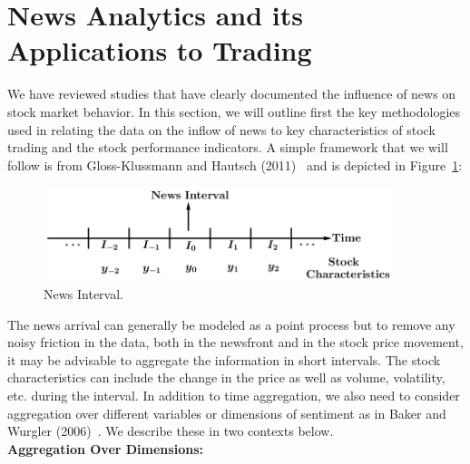 \section{News Analytics and its Applications to Trading}


We have reviewed studies that have clearly documented the influence of news on stock market behavior. In this section, we will outline first the key methodologies used in relating the data on the inflow of news to key characteristics of stock trading and the stock performance indicators. A simple framework that we will follow is from Gloss-Klussmann and Hautsch (2011)~\cite{klub} and is depicted in Figure~\ref{fig:intervals}:

	\begin{figure}[!ht]
	\centering
	\includegraphics[width=4in]{chapters/chapter_news_an/figures/ch4sec4intervals.png} 
	\caption{News Interval.\label{fig:intervals}}
	\end{figure}

The news arrival can generally be modeled as a point process but to remove any noisy friction in the data, both in the newsfront and in the stock price movement, it may be advisable to aggregate the information in short intervals. The stock characteristics can include the change in the price as well as volume, volatility, etc. during the interval. In addition to time aggregation, we also need to consider aggregation over different variables or dimensions of sentiment as in Baker and Wurgler (2006)~\cite{baker2006investor}. We describe these in two contexts below. \\


\noindent\textbf{Aggregation Over Dimensions:} \\



